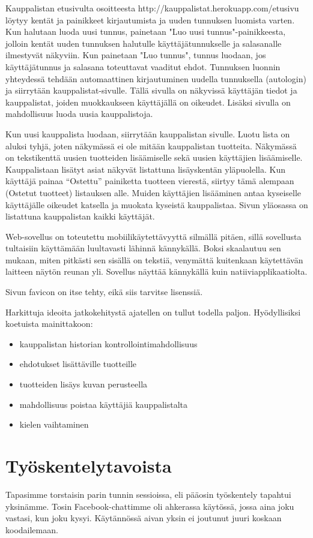 \documentclass[12pt,a4paper]{article}
\begin{document}
Kauppalistan etusivulta osoitteesta http://kauppalistat.herokuapp.com/etusivu löytyy kentät ja painikkeet kirjautumista ja uuden tunnuksen luomista varten. Kun halutaan luoda uusi tunnus, painetaan "Luo uusi tunnus"-painikkeesta, jolloin kentät uuden tunnuksen halutulle käyttäjätunnukselle ja salasanalle ilmestyvät näkyviin. Kun painetaan "Luo tunnus", tunnus luodaan, jos käyttäjätunnus ja salasana toteuttavat vaaditut ehdot. Tunnuksen luonnin yhteydessä tehdään automaattinen kirjautuminen uudella tunnuksella (autologin) ja siirrytään kauppalistat-sivulle. Tällä sivulla on näkyvissä käyttäjän tiedot ja kauppalistat, joiden muokkaukseen käyttäjällä on oikeudet. Lisäksi sivulla on mahdollisuus luoda uusia kauppalistoja.

Kun uusi kauppalista luodaan, siirrytään kauppalistan sivulle. Luotu lista on aluksi tyhjä, joten näkymässä ei ole mitään kauppalistan tuotteita. Näkymässä on tekstikenttä uusien tuotteiden lisäämiselle sekä uusien käyttäjien lisäämiselle. Kauppalistaan lisätyt asiat näkyvät listattuna lisäyskentän yläpuolella. Kun käyttäjä painaa “Ostettu” painiketta tuotteen vierestä, siirtyy tämä alempaan (Ostetut tuotteet) listauksen alle. Muiden käyttäjien lisääminen antaa kyseiselle käyttäjälle oikeudet katsella ja muokata kyseistä kauppalistaa. Sivun yläosassa on listattuna kauppalistan kaikki käyttäjät.

Web-sovellus on toteutettu mobiilikäytettävyyttä silmällä pitäen, sillä sovellusta tultaisiin käyttämään luultavasti lähinnä kännykällä. Boksi skaalautuu sen mukaan, miten pitkästi sen sisällä on tekstiä, venymättä kuitenkaan käytettävän laitteen näytön reunan yli. Sovellus näyttää kännykällä kuin natiiviapplikaatiolta.

Sivun favicon on itse tehty, eikä siis tarvitse lisenssiä.

Harkittuja ideoita jatkokehitystä ajatellen on tullut todella paljon. Hyödyllisiksi koetuista mainittakoon:
\begin{itemize}
    \item kauppalistan historian kontrollointimahdollisuus
    \item ehdotukset lisättäville tuotteille
    \item tuotteiden lisäys kuvan perusteella
    \item mahdollisuus poistaa käyttäjiä kauppalistalta
    \item kielen vaihtaminen
\end{itemize}

\section*{Työskentelytavoista}
Tapasimme torstaisin parin tunnin sessioissa, eli pääosin työskentely tapahtui yksinämme. Tosin Facebook-chattimme oli ahkerassa käytössä, jossa aina joku vastasi, kun joku kysyi. Käytännössä aivan yksin ei joutunut juuri koskaan koodailemaan.
\end{document}
